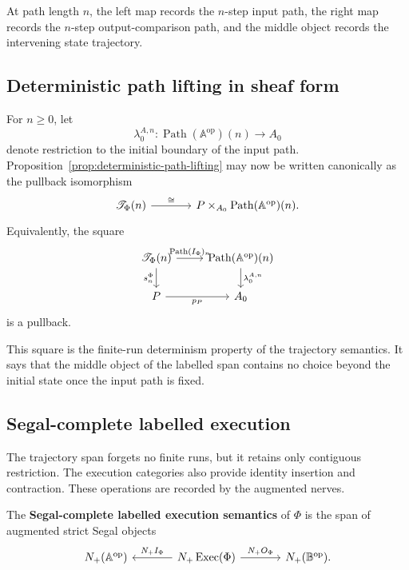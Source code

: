 At path length \(n\), the left map records the \(n\)-step input path, the
right map records the \(n\)-step output-comparison path, and the middle object
records the intervening state trajectory.

\subsection{Deterministic path lifting in sheaf form}
\label{subsec:deterministic-path-lifting-sheaf-form}

For \(n\geq0\), let
\[
    \lambda_0^{A,n}:
    \operatorname{Path}(\mathbb A^{\mathrm{op}})(n)
    \to A_0
\]
denote restriction to the initial boundary of the input path.
Proposition~\ref{prop:deterministic-path-lifting} may now be written
canonically as the pullback isomorphism
\[
\begin{tikzcd}[column sep=large]
    \mathscr T_\Phi(n)
        \arrow[r, "\cong"]
    &
    P\times_{A_0}
    \operatorname{Path}(\mathbb A^{\mathrm{op}})(n).
\end{tikzcd}
\]
Equivalently, the square
\[
\begin{tikzcd}
    \mathscr T_\Phi(n)
        \arrow[r, "{\operatorname{Path}(I_\Phi)_n}"]
        \arrow[d, "s_n^\Phi"']
    &
    \operatorname{Path}(\mathbb A^{\mathrm{op}})(n)
        \arrow[d, "{\lambda_0^{A,n}}"]
    \\
    P
        \arrow[r, "p_P"']
    &
    A_0
\end{tikzcd}
\]
is a pullback.

This square is the finite-run determinism property of the trajectory
semantics. It says that the middle object of the labelled span contains no
choice beyond the initial state once the input path is fixed.

\subsection{Segal-complete labelled execution}
\label{subsec:segal-enhanced-execution-semantics}

The trajectory span forgets no finite runs, but it retains only contiguous
restriction. The execution categories also provide identity insertion and
contraction. These operations are recorded by the augmented nerves.

\begin{definition}
\label{def:segal-enhanced-execution-semantics}
The \textbf{Segal-complete labelled execution semantics} of \(\Phi\) is the
span of augmented strict Segal objects
\[
\begin{tikzcd}[column sep=large]
    N_+(\mathbb A^{\mathrm{op}})
    &
    N_+\operatorname{Exec}(\Phi)
        \arrow[l, "N_+I_\Phi"']
        \arrow[r, "N_+O_\Phi"]
    &
    N_+(\mathbb B^{\mathrm{op}}).
\end{tikzcd}
\]
\end{definition}

